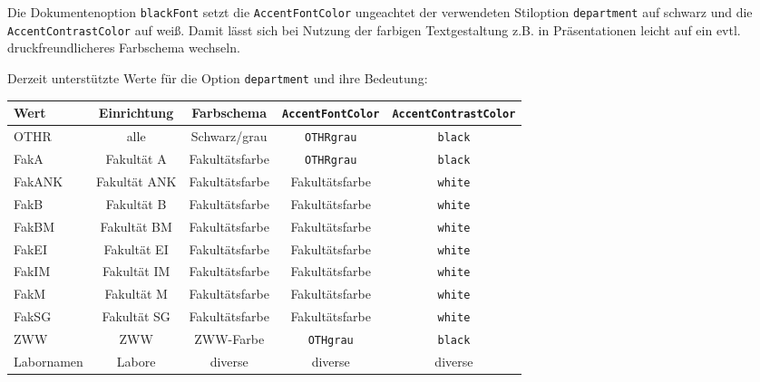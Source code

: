Die Dokumentenoption \verb+blackFont+  setzt die \texttt{AccentFontColor} ungeachtet der verwendeten Stiloption \verb+department+ auf schwarz und die \texttt{AccentContrastColor} auf weiß.
Damit lässt sich bei Nutzung der farbigen Textgestaltung z.B. in Präsentationen leicht auf ein evtl. druckfreundlicheres Farbschema wechseln.



Derzeit unterstützte Werte für die Option \verb+department+ und ihre Bedeutung:

\begin{table}[!h!]
\centering\scriptsize
\begin{tabular}{lcccc}\toprule
\textbf{Wert} & Einrichtung & Farbschema & \verb+AccentFontColor+ & \verb+AccentContrastColor+\\\midrule
OTHR & alle & Schwarz/grau & \verb+OTHRgrau+ & \verb+black+ \\
FakA & Fakultät A & Fakultätsfarbe & \verb+OTHRgrau+ & \verb+black+ \\
FakANK & Fakultät ANK & Fakultätsfarbe & Fakultätsfarbe & \verb+white+ \\
FakB & Fakultät B & Fakultätsfarbe & Fakultätsfarbe & \verb+white+ \\
FakBM & Fakultät BM & Fakultätsfarbe & Fakultätsfarbe & \verb+white+ \\
FakEI & Fakultät EI & Fakultätsfarbe & Fakultätsfarbe & \verb+white+ \\
FakIM & Fakultät IM & Fakultätsfarbe & Fakultätsfarbe & \verb+white+ \\
FakM & Fakultät M & Fakultätsfarbe & Fakultätsfarbe & \verb+white+ \\
FakSG & Fakultät SG & Fakultätsfarbe & Fakultätsfarbe & \verb+white+ \\
ZWW & ZWW & ZWW-Farbe & \verb+OTHgrau+ & \verb+black+ \\
Labornamen & Labore & diverse & diverse & diverse \\
\bottomrule
\end{tabular}
\end{table}

